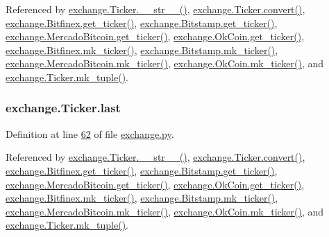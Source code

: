Referenced by \hyperlink{exchange_8py_source_l00111}{exchange.\+Ticker.\+\_\+\+\_\+str\+\_\+\+\_\+()}, \hyperlink{exchange_8py_source_l00065}{exchange.\+Ticker.\+convert()}, \hyperlink{exchange_8py_source_l00340}{exchange.\+Bitfinex.\+get\+\_\+ticker()}, \hyperlink{exchange_8py_source_l00409}{exchange.\+Bitstamp.\+get\+\_\+ticker()}, \hyperlink{exchange_8py_source_l00543}{exchange.\+Mercado\+Bitcoin.\+get\+\_\+ticker()}, \hyperlink{exchange_8py_source_l00608}{exchange.\+Ok\+Coin.\+get\+\_\+ticker()}, \hyperlink{exchange_8py_source_l00354}{exchange.\+Bitfinex.\+mk\+\_\+ticker()}, \hyperlink{exchange_8py_source_l00423}{exchange.\+Bitstamp.\+mk\+\_\+ticker()}, \hyperlink{exchange_8py_source_l00557}{exchange.\+Mercado\+Bitcoin.\+mk\+\_\+ticker()}, \hyperlink{exchange_8py_source_l00622}{exchange.\+Ok\+Coin.\+mk\+\_\+ticker()}, and \hyperlink{exchange_8py_source_l00096}{exchange.\+Ticker.\+mk\+\_\+tuple()}.

\subsubsection[{\texorpdfstring{last}{last}}]{\setlength{\rightskip}{0pt plus 5cm}exchange.\+Ticker.\+last}\hypertarget{classexchange_1_1_ticker_add7c2d95fa790dcdffddae2e584ce5f5}{}\label{classexchange_1_1_ticker_add7c2d95fa790dcdffddae2e584ce5f5}


Definition at line \hyperlink{exchange_8py_source_l00062}{62} of file \hyperlink{exchange_8py_source}{exchange.\+py}.



Referenced by \hyperlink{exchange_8py_source_l00111}{exchange.\+Ticker.\+\_\+\+\_\+str\+\_\+\+\_\+()}, \hyperlink{exchange_8py_source_l00065}{exchange.\+Ticker.\+convert()}, \hyperlink{exchange_8py_source_l00340}{exchange.\+Bitfinex.\+get\+\_\+ticker()}, \hyperlink{exchange_8py_source_l00409}{exchange.\+Bitstamp.\+get\+\_\+ticker()}, \hyperlink{exchange_8py_source_l00543}{exchange.\+Mercado\+Bitcoin.\+get\+\_\+ticker()}, \hyperlink{exchange_8py_source_l00608}{exchange.\+Ok\+Coin.\+get\+\_\+ticker()}, \hyperlink{exchange_8py_source_l00354}{exchange.\+Bitfinex.\+mk\+\_\+ticker()}, \hyperlink{exchange_8py_source_l00423}{exchange.\+Bitstamp.\+mk\+\_\+ticker()}, \hyperlink{exchange_8py_source_l00557}{exchange.\+Mercado\+Bitcoin.\+mk\+\_\+ticker()}, \hyperlink{exchange_8py_source_l00622}{exchange.\+Ok\+Coin.\+mk\+\_\+ticker()}, and \hyperlink{exchange_8py_source_l00096}{exchange.\+Ticker.\+mk\+\_\+tuple()}.


